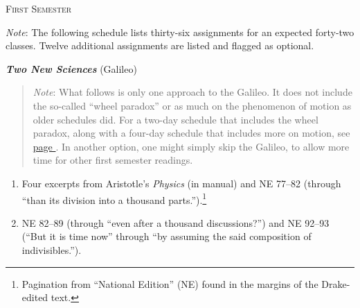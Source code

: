 \documentclass[10pt]{article}
\begin{document}


\newpage

\begin{center}
  \textsc{\small{First Semester}}
\end{center} 
\label{First}
{\small \emph{Note}: The following schedule 
lists thirty-six assignments for an expected forty-two classes.
Twelve additional assignments are listed and flagged as optional.}

\textbf{\emph{Two New Sciences}} (Galileo)
  \begin{quote}
    \small{\emph{Note}: What follows is only one approach to the Galileo.
    It does not include the so-called ``wheel paradox'' 
    or as much on the phenomenon of motion 
    as older schedules did.  
    For a two-day schedule that includes 
    the wheel paradox, along with a four-day schedule
    that includes more on motion,
    see \hyperref[Galileo]{page \pageref{Galileo}}.
    In another option, one might simply skip the Galileo,
    to allow more time for other first semester readings.} 
  \end{quote}
  \begin{enumerate}[noitemsep]
    \item Four excerpts from Aristotle's \emph{Physics}
		(in manual) and NE 77--82 (through ``than
		its division into a thousand
		parts.'').\footnote{Pagination from
			``National Edition'' (NE) found in
			the margins of the Drake-edited
			text.} \item  NE 82--89 (through
		``even after a thousand discussions?'') and
		NE 92--93 (``But it is time now'' through
		``by assuming the said composition of
		indivisibles.'').  \end{enumerate}
\end{document}
